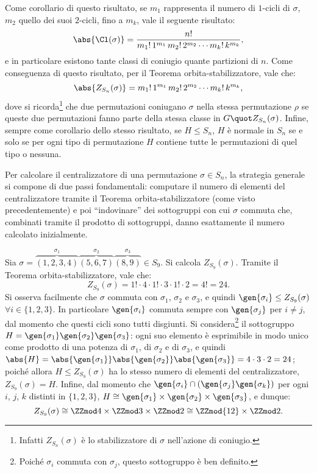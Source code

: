 \documentclass[12pt]{scrartcl}
\begin{document}
	Come corollario di questo risultato, se $m_1$ rappresenta il numero di $1$-cicli di $\sigma$, $m_2$ quello dei suoi $2$-cicli, fino a $m_k$, vale il seguente risultato:
	\[ \abs{\Cl(\sigma)} = \frac{n!}{m_1! \, 1^{m_1} \, m_2! \, 2^{m_2} \cdots m_k! \, k^{m_k}}, \]
	e in particolare esistono tante classi di coniugio quante partizioni di $n$.
	Come conseguenza di questo risultato, per il Teorema orbita-stabilizzatore,
	vale che:
	\[ \abs{Z_{S_n}(\sigma)} = m_1! \, 1^{m_1} \, m_2! \, 2^{m_2} \cdots m_k! \, k^{m_k}, \]
	dove si ricorda\footnote{
		Infatti $Z_{S_n}(\sigma)$ è lo stabilizzatore di $\sigma$ nell'azione di coniugio.
	} che due permutazioni coniugano $\sigma$ nella stessa permutazione
	$\rho$ se queste due permutazioni fanno parte della stessa classe in $G \quot Z_{S_n}(\sigma)$. Infine,
	sempre come corollario dello stesso risultato,
	se $H \leq S_n$, $H$ è normale in $S_n$ se e solo se per ogni tipo di
	permutazione $H$ contiene
	tutte le permutazioni di quel tipo o nessuna. \medskip
	
	
	Per calcolare il centralizzatore di una permutazione $\sigma \in S_n$, la
	strategia generale si compone di due passi fondamentali: computare il
	numero di elementi del centralizzatore tramite il Teorema orbita-stabilizzatore
	(come visto precedentemente) e poi ``indovinare'' dei sottogruppi con
	cui $\sigma$ commuta che, combinati tramite il prodotto di sottogruppi,
	danno esattamente il numero calcolato inizialmente.
	
	\begin{example}
		Sia $\sigma = \overbrace{(1,2,3,4)}^{\sigma_1}\overbrace{(5,6,7)}^{\sigma_2}\overbrace{(8,9)}^{\sigma_3} \in S_9$. Si calcola $Z_{S_9}(\sigma)$.
		Tramite il Teorema orbita-stabilizzatore, vale che:
		\[ Z_{S_9}(\sigma) = 1! \cdot 4 \cdot 1! \cdot 3 \cdot 1! \cdot 2 = 4! = 24. \]
		Si osserva facilmente che $\sigma$ commuta con $\sigma_1$, $\sigma_2$ e
		$\sigma_3$, e quindi $\gen{\sigma_i} \leq Z_{S_9}(\sigma)$ $\forall i \in \{1,2,3\}$.
		In particolare $\gen{\sigma_i}$ commuta sempre con $\gen{\sigma_j}$ per $i \neq j$,
		dal momento che questi cicli sono tutti disgiunti. Si considera\footnote{
			Poiché $\sigma_i$ commuta con $\sigma_j$, questo sottogruppo è ben definito.
		} il
		sottogruppo $H = \gen{\sigma_1}\gen{\sigma_2}\gen{\sigma_3}$: ogni suo elemento
		è esprimibile in modo unico come prodotto di una potenza di $\sigma_1$, di
		$\sigma_2$ e di $\sigma_3$, e quindi $\abs{H} = \abs{\gen{\sigma_1}} \abs{\gen{\sigma_2}} \abs{\gen{\sigma_3}} = 4 \cdot 3 \cdot 2 = 24$; poiché
		allora $H \leq Z_{S_9}(\sigma)$ ha lo stesso numero di elementi del centralizzatore,
		$Z_{S_9}(\sigma) = H$. Infine, dal
		momento che $\gen{\sigma_i} \cap (\gen{\sigma_j} \gen{\sigma_k})$ per ogni
		$i$, $j$, $k$ distinti in $\{1, 2, 3\}$, $H \cong \gen{\sigma_1} \times \gen{\sigma_2} \times \gen{\sigma_3}$, e dunque:
		\[ Z_{S_9}(\sigma) \cong \ZZmod4 \times \ZZmod3 \times \ZZmod2 \cong \ZZmod{12} \times \ZZmod2. \]
	\end{example} \bigskip
\end{document}
